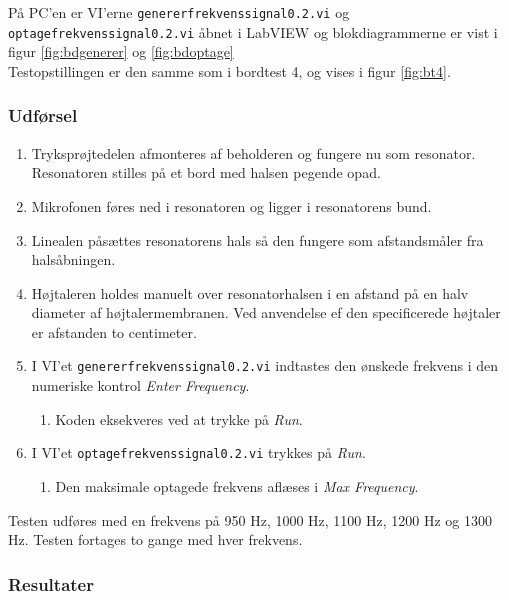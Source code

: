 		På PC'en er VI'erne \texttt{genererfrekvenssignal0.2.vi} og \texttt{optagefrekvenssignal0.2.vi} åbnet i LabVIEW og blokdiagrammerne er vist i figur \ref{fig:bdgenerer} og \ref{fig:bdoptage} \\ Testopstillingen er den samme som i bordtest 4, og vises i figur \ref{fig:bt4}.  
		

		\subsubsection{Udførsel}
			
			\begin{enumerate}
				\item Tryksprøjtedelen afmonteres af beholderen og fungere nu som resonator. Resonatoren stilles på et bord med halsen pegende opad. 
				\item Mikrofonen føres ned i resonatoren og ligger i resonatorens bund. 
				\item Linealen påsættes resonatorens hals så den fungere som afstandsmåler fra halsåbningen.
				\item Højtaleren holdes manuelt over resonatorhalsen i en afstand på en halv diameter af højtalermembranen. Ved anvendelse ef den specificerede højtaler er afstanden to centimeter. 
				\item I VI'et \texttt{genererfrekvenssignal0.2.vi} indtastes den ønskede frekvens i den numeriske kontrol \textit{Enter Frequency}. 
					\begin{enumerate}
						\item Koden eksekveres ved at trykke på \textit{Run}. 
					\end{enumerate} 
				\item I VI'et \texttt{optagefrekvenssignal0.2.vi} trykkes på \textit{Run}. 
					\begin{enumerate}
						\item Den maksimale optagede frekvens aflæses i \textit{Max Frequency}. 
					\end{enumerate}	 	
			\end{enumerate}
			
			Testen udføres med en frekvens på 950 Hz, 1000 Hz, 1100 Hz, 1200 Hz og 1300 Hz. Testen fortages to gange med hver frekvens.  
			
			\subsubsection{Resultater}
			
